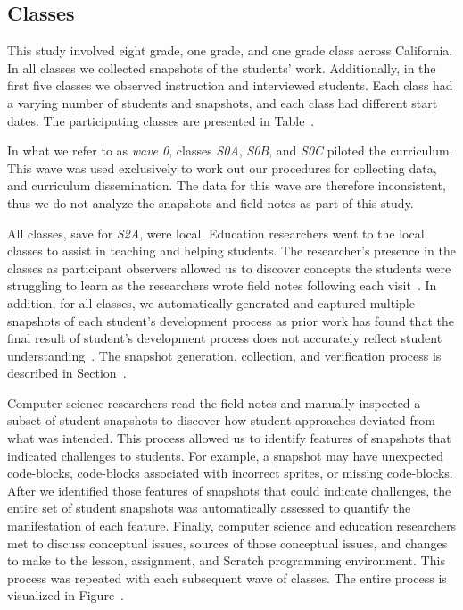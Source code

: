\subsection{Classes} 
This study involved eight  grade, one  grade, and one 
grade class across California. In all classes we collected snapshots of the
students' work. Additionally, in the first five classes we observed instruction
and interviewed students. Each class had a varying number of students and
snapshots, and each class had different start dates. The participating classes
are presented in Table~.

In what we refer to as \emph{wave 0}, classes \emph{S0A}, \emph{S0B}, and
\emph{S0C} piloted the curriculum. This wave was used exclusively to work out
our procedures for collecting data, and curriculum dissemination. The data for
this wave are therefore inconsistent, thus we do not analyze the snapshots and
field notes as part of this study.

All classes, save for \emph{S2A}, were local. Education researchers went to the
local classes to assist in teaching and helping students. The researcher's
presence in the classes as participant observers allowed us to discover
concepts the students were struggling to learn as the researchers wrote field
notes following each visit~\cite{spradley80}. In addition, for all classes, we
automatically generated and captured multiple snapshots of each student's
development process as prior work has found that the final result of student's
development process does not accurately reflect student
understanding~\cite{Piech:2012:MSL:2157136.2157182,brennan12}. The snapshot
generation, collection, and verification process is described in
Section~.

Computer science researchers read the field notes and manually inspected a
subset of student snapshots to discover how student approaches deviated from
what was intended. This process allowed us to identify features of snapshots
that indicated challenges to students. For example, a snapshot may have
unexpected code-blocks, code-blocks associated with incorrect sprites, or
missing code-blocks.  After we identified those features of snapshots that
could indicate challenges, the entire set of student snapshots was
automatically assessed to quantify the manifestation of each feature. Finally,
computer science and education researchers met to discuss conceptual issues,
sources of those conceptual issues, and changes to make to the lesson,
assignment, and Scratch programming environment. This process was repeated with
each subsequent wave of classes. The entire process is visualized in
Figure~.

